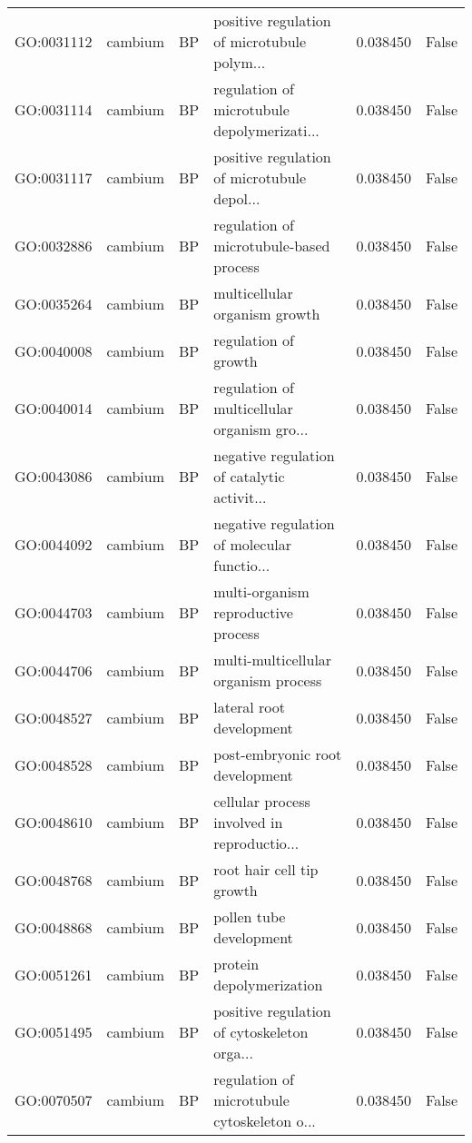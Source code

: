 \begin{longtable}{llllrl}
GO:0031112 & cambium & BP &   positive regulation of microtubule polym...  & 0.038450 &   False \\
GO:0031114 & cambium & BP &   regulation of microtubule depolymerizati...  & 0.038450 &   False \\
GO:0031117 & cambium & BP &   positive regulation of microtubule depol...  & 0.038450 &   False \\
GO:0032886 & cambium & BP &       regulation of microtubule-based process  & 0.038450 &   False \\
GO:0035264 & cambium & BP &                 multicellular organism growth  & 0.038450 &   False \\
GO:0040008 & cambium & BP &                          regulation of growth  & 0.038450 &   False \\
GO:0040014 & cambium & BP &   regulation of multicellular organism gro...  & 0.038450 &   False \\
GO:0043086 & cambium & BP &   negative regulation of catalytic activit...  & 0.038450 &   False \\
GO:0044092 & cambium & BP &   negative regulation of molecular functio...  & 0.038450 &   False \\
GO:0044703 & cambium & BP &           multi-organism reproductive process  & 0.038450 &   False \\
GO:0044706 & cambium & BP &          multi-multicellular organism process  & 0.038450 &   False \\
GO:0048527 & cambium & BP &                      lateral root development  & 0.038450 &   False \\
GO:0048528 & cambium & BP &               post-embryonic root development  & 0.038450 &   False \\
GO:0048610 & cambium & BP &   cellular process involved in reproductio...  & 0.038450 &   False \\
GO:0048768 & cambium & BP &                     root hair cell tip growth  & 0.038450 &   False \\
GO:0048868 & cambium & BP &                       pollen tube development  & 0.038450 &   False \\
GO:0051261 & cambium & BP &                      protein depolymerization  & 0.038450 &   False \\
GO:0051495 & cambium & BP &   positive regulation of cytoskeleton orga...  & 0.038450 &   False \\
GO:0070507 & cambium & BP &   regulation of microtubule cytoskeleton o...  & 0.038450 &   False \\

\end{longtable}
